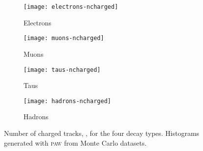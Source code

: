 \begin{figure}
    \centering
    \begin{subfigure}[c]{0.48\linewidth}
        \centering
        \texttt{[image: electrons-ncharged]}
        \caption{%
            Electrons
        }
        \label{fig:paw-ncharged/electrons}
    \end{subfigure}
    \hfill
    \begin{subfigure}[c]{0.48\linewidth}
        \centering
        \texttt{[image: muons-ncharged]}
        \caption{%
            Muons
        }
        \label{fig:paw-ncharged/muons}
    \end{subfigure}

    \vspace{2ex}

    \begin{subfigure}[c]{0.48\linewidth}
        \centering
        \texttt{[image: taus-ncharged]}
        \caption{%
            Taus
        }
        \label{fig:paw-ncharged/taus}
    \end{subfigure}
    \hfill
    \begin{subfigure}[c]{0.48\linewidth}
        \centering
        \texttt{[image: hadrons-ncharged]}
        \caption{%
            Hadrons
        }
        \label{fig:paw-ncharged/hadrons}
    \end{subfigure}

    \caption{%
        Number of charged tracks, \ncharged, for the four decay types.
        Histograms generated with \textsc{paw} from Monte Carlo datasets.
    }
    \label{fig:paw-ncharged}
\end{figure}
